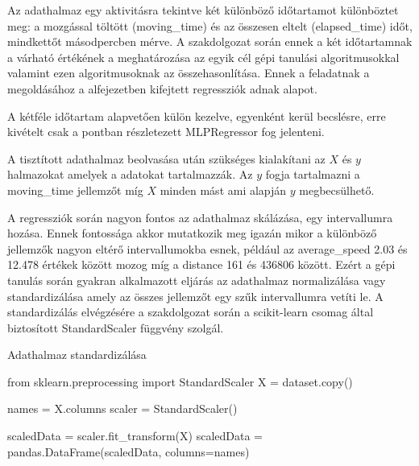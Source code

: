 



Az adathalmaz egy aktivitásra tekintve két különböző időtartamot különböztet meg: a mozgással töltött (moving\_time) és az összesen eltelt (elapsed\_time) időt, mindkettőt másodpercben mérve. A szakdolgozat során ennek a két időtartamnak a várható értékének a meghatározása az egyik cél gépi tanulási algoritmusokkal valamint ezen algoritmusoknak az összehasonlítása. Ennek a feladatnak a megoldásához a   alfejezetben kifejtett regressziók adnak alapot.

A kétféle időtartam alapvetően külön kezelve, egyenként kerül becslésre, erre kivételt csak a  pontban részletezett MLPRegressor fog jelenteni.


A tisztított adathalmaz beolvasása után szükséges kialakítani az $X$ és $y$ halmazokat amelyek a \TODO adatokat tartalmazzák. Az $y$ fogja tartalmazni a moving\_time jellemzőt míg $X$ minden mást ami alapján $y$ megbecsülhető. 

A regressziók során nagyon fontos az adathalmaz skálázása, egy intervallumra hozása. Ennek fontossága akkor mutatkozik meg igazán mikor a különböző jellemzők nagyon eltérő intervallumokba esnek, például az average\_speed 2.03 és 12.478 értékek között mozog míg a distance 161 és 436806 között. Ezért a gépi tanulás során gyakran alkalmazott eljárás az adathalmaz normalizálása vagy standardizálása amely az összes jellemzőt egy szűk intervallumra vetíti le. A standardizálás elvégzésére a szakdolgozat során a scikit-learn csomag által biztosított StandardScaler függvény szolgál.

\begin{programreszlet}   
Adathalmaz standardizálása

\begin{python}
from sklearn.preprocessing import StandardScaler
X = dataset.copy()

names = X.columns
scaler = StandardScaler()

scaledData = scaler.fit_transform(X)
scaledData = pandas.DataFrame(scaledData, columns=names)
\end{python}
\label{prog:movingStandard}
\end{programreszlet}

